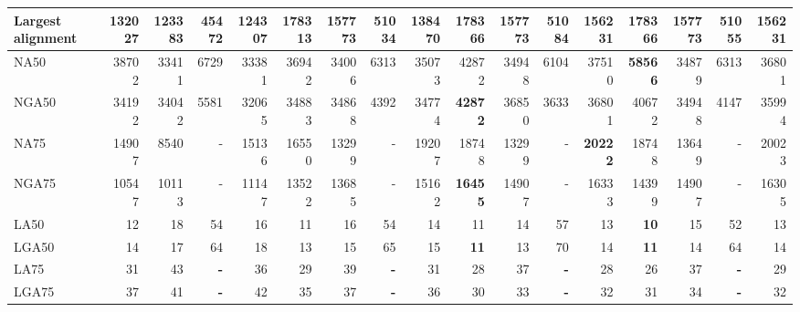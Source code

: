 \documentclass[12pt,a4paper]{article}
\begin{document}
\begin{table}[ht]
\begin{center}
\begin{tabular}{|l*{16}{|r}|}
Largest alignment & 132027 & 123383 & 45472 & 124307 & 178313 & 157773 & 51034 & 138470 & {\bf 178366} & 157773 & 51084 & 156231 & {\bf 178366} & 157773 & 51055 & 156231 \\ \hline
NA50 & 38702 & 33411 & 6729 & 33381 & 36942 & 34006 & 6313 & 35073 & 42872 & 34948 & 6104 & 37510 & {\bf 58566} & 34879 & 6313 & 36801 \\ \hline
NGA50 & 34192 & 34042 & 5581 & 32065 & 34883 & 34868 & 4392 & 34774 & {\bf 42872} & 36850 & 3633 & 36801 & 40672 & 34948 & 4147 & 35994 \\ \hline
NA75 & 14907 & 8540 & - & 15136 & 16550 & 13299 & - & 19207 & 18748 & 13299 & - & {\bf 20222} & 18748 & 13649 & - & 20023 \\ \hline
NGA75 & 10547 & 10113 & - & 11147 & 13522 & 13685 & - & 15162 & {\bf 16455} & 14907 & - & 16333 & 14399 & 14907 & - & 16305 \\ \hline
LA50 & 12 & 18 & 54 & 16 & 11 & 16 & 54 & 14 & 11 & 14 & 57 & 13 & {\bf 10} & 15 & 52 & 13 \\ \hline
LGA50 & 14 & 17 & 64 & 18 & 13 & 15 & 65 & 15 & {\bf 11} & 13 & 70 & 14 & {\bf 11} & 14 & 64 & 14 \\ \hline
LA75 & 31 & 43 & {\bf -} & 36 & 29 & 39 & {\bf -} & 31 & 28 & 37 & {\bf -} & 28 & 26 & 37 & {\bf -} & 29 \\ \hline
LGA75 & 37 & 41 & {\bf -} & 42 & 35 & 37 & {\bf -} & 36 & 30 & 33 & {\bf -} & 32 & 31 & 34 & {\bf -} & 32 \\ \hline
\end{tabular}
\end{center}
\end{table}
\end{document}
